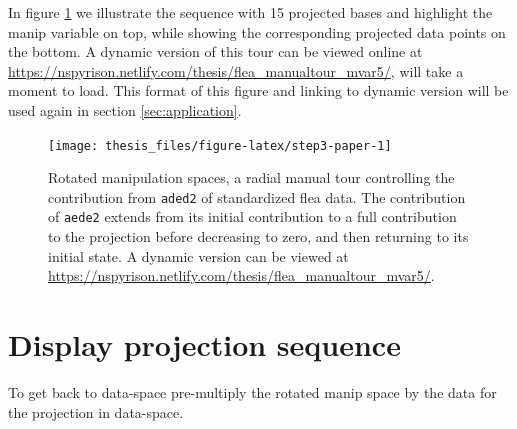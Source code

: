 \documentclass{monashthesis}
\begin{document}
\begin{Shaded}
\begin{Highlighting}[]
 
\StringTok{ }\OperatorTok{+}\StringTok{ }
\StringTok{ }\NormalTok{(manip_space, theta, phi)[, }\OperatorTok{:}\NormalTok{]}
\NormalTok{\}}
\end{Highlighting}
\end{Shaded}

In figure \ref{fig:step3-paper} we illustrate the sequence with 15
projected bases and highlight the manip variable on top, while showing
the corresponding projected data points on the bottom. A dynamic version
of this tour can be viewed online at
\url{https://nspyrison.netlify.com/thesis/flea_manualtour_mvar5/}, will
take a moment to load. This format of this figure and linking to dynamic
version will be used again in section \ref{sec:application}.









\begin{figure}

{\centering \texttt{[image: thesis\_files/figure-latex/step3-paper-1]} 

}

\caption{Rotated manipulation spaces, a radial manual tour
controlling the contribution from \texttt{aded2} of standardized flea
data. The contribution of \texttt{aede2} extends from its initial
contribution to a full contribution to the projection before decreasing
to zero, and then returning to its initial state. A dynamic version can
be viewed at
\url{https://nspyrison.netlify.com/thesis/flea_manualtour_mvar5/}.}\label{fig:step3-paper}
\end{figure}

\section{Display projection
sequence}\label{display-projection-sequence-1}

To get back to data-space pre-multiply the rotated manip space by the
data for the projection in data-space.
\end{document}

